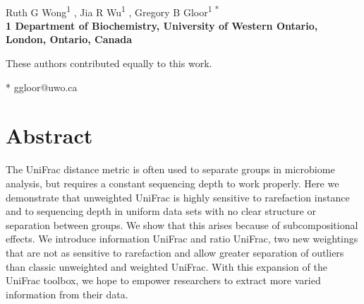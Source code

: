 \documentclass[10pt,letterpaper]{article}
\date{}
\begin{document}
\vspace*{0.35in}

\begin{flushleft}
{\Large
\textbf{}
}
\newline
\\
Ruth G Wong\textsuperscript{1 \Yinyang},
Jia R Wu\textsuperscript{1 \Yinyang},
Gregory B Gloor\textsuperscript{1 *}
\\
\bigskip
\bf{1} Department of Biochemistry, University of Western Ontario, London, Ontario, Canada
\\
\bigskip

% 
%
\Yinyang These authors contributed equally to this work.





* ggloor@uwo.ca

\end{flushleft}
\section*{Abstract}
The UniFrac distance metric is often used to separate groups in microbiome analysis, but requires a constant sequencing depth to work properly. Here we demonstrate that unweighted UniFrac is highly sensitive to rarefaction instance and to sequencing depth in uniform data sets with no clear structure or separation between groups. We show that this arises because of subcompositional effects. We introduce information UniFrac and ratio UniFrac, two new weightings that are not as sensitive to rarefaction and allow greater separation of outliers than classic unweighted and weighted UniFrac. With this expansion of the UniFrac toolbox, we hope to empower researchers to extract more varied information from their data.
\end{document}
